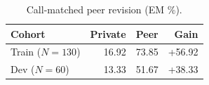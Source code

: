 \begin{table}[ht]
\centering
\caption{Call-matched peer revision (EM \%).}
\begin{tabular}{lrrr}\hline
Cohort & Private & Peer & Gain \\\hline
Train ($N=130$) & 16.92 & 73.85 & +56.92 \\
Dev ($N=60$) & 13.33 & 51.67 & +38.33 \\\hline
\end{tabular}
\end{table}
